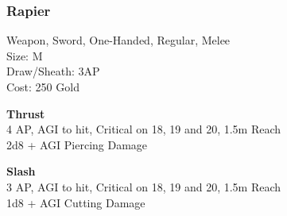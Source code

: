 \subsubsection{Rapier}\label{weapon:rapier}
Weapon, Sword, One-Handed, Regular, Melee\\
Size: M\\
Draw/Sheath: 3AP\\
Cost: 250 Gold

\textbf{Thrust}\\
4 AP, AGI to hit, Critical on 18, 19 and 20, 1.5m Reach\\
2d8 + \texttimes AGI Piercing Damage

\textbf{Slash}\\
3 AP, AGI to hit, Critical on 18, 19 and 20, 1.5m Reach\\
1d8 + \texttimes AGI Cutting Damage